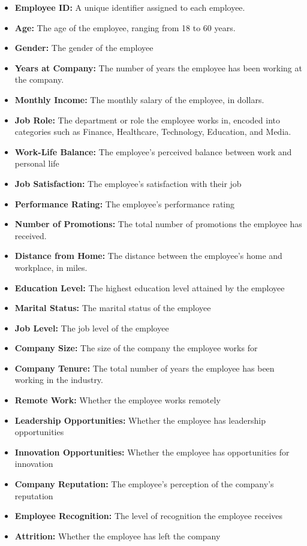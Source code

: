 \documentclass[
  10pt,
  paper=a4,
  ,captions=tableheading
]{scrartcl}
\begin{document}
\begin{itemize}
\item
  \textbf{Employee ID:} A unique identifier assigned to each employee.
\item
  \textbf{Age:} The age of the employee, ranging from 18 to 60 years.
\item
  \textbf{Gender:} The gender of the employee
\item
  \textbf{Years at Company:} The number of years the employee has been
  working at the company.
\item
  \textbf{Monthly Income:} The monthly salary of the employee, in
  dollars.
\item
  \textbf{Job Role:} The department or role the employee works in,
  encoded into categories such as Finance, Healthcare, Technology,
  Education, and Media.
\item
  \textbf{Work-Life Balance:} The employee's perceived balance between
  work and personal life
\item
  \textbf{Job Satisfaction:} The employee's satisfaction with their job
\item
  \textbf{Performance Rating:} The employee's performance rating
\item
  \textbf{Number of Promotions:} The total number of promotions the
  employee has received.
\item
  \textbf{Distance from Home:} The distance between the employee's home
  and workplace, in miles.
\item
  \textbf{Education Level:} The highest education level attained by the
  employee
\item
  \textbf{Marital Status:} The marital status of the employee
\item
  \textbf{Job Level:} The job level of the employee
\item
  \textbf{Company Size:} The size of the company the employee works for
\item
  \textbf{Company Tenure:} The total number of years the employee has
  been working in the industry.
\item
  \textbf{Remote Work:} Whether the employee works remotely
\item
  \textbf{Leadership Opportunities:} Whether the employee has leadership
  opportunities
\item
  \textbf{Innovation Opportunities:} Whether the employee has
  opportunities for innovation
\item
  \textbf{Company Reputation:} The employee's perception of the
  company's reputation
\item
  \textbf{Employee Recognition:} The level of recognition the employee
  receives
\item
  \textbf{Attrition:} Whether the employee has left the company
\end{itemize}
\end{document}
